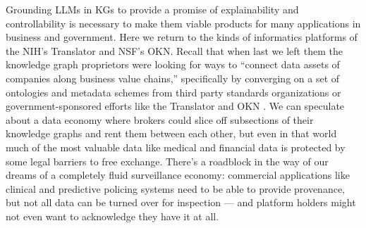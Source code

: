 Grounding LLMs in KGs to provide a promise of explainability and
controllability is necessary to make them viable products for many
applications in business and government. Here we return to the kinds of
informatics platforms of the NIH's Translator and NSF's OKN. Recall that
when last we left them the knowledge graph proprietors were looking for
ways to ``connect data assets of companies along business value
chains,'' specifically by converging on a set of ontologies and metadata
schemes from third party standards organizations or government-sponsored
efforts like the Translator and OKN \cite{panExploitingLinkedData2017} . We can speculate about a data economy
where brokers could slice off subsections of their knowledge graphs and
rent them between each other, but even in that world much of the most
valuable data like medical and financial data is protected by some legal
barriers to free exchange. There's a roadblock in the way of our dreams
of a completely fluid surveillance economy: commercial applications like
clinical and predictive policing systems need to be able to provide
provenance, but not all data can be turned over for inspection --- and
platform holders might not even want to acknowledge they have it at all.

